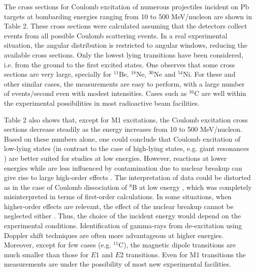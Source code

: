 \documentclass[prc,preprint,showpacs,showkeys,nofootinbib]{revtex4}%
\begin{document}
\newpage

The cross sections for Coulomb excitation of numerous projectiles
incident on Pb targets at bombarding energies ranging from 10 to 500
MeV/nucleon are shown in Table 2.  These cross sections were
calculated assuming that the detectors collect events from all
possible Coulomb scattering events. In a real experimental
situation, the angular distribution is restricted to angular
windows, reducing the available cross sections. Only the lowest
lying transitions have been considered, i.e. from the ground to the
first excited states. One observes that some cross sections are very
large, specially for $^{11}$Be, $^{18}$Ne, $^{30}$Ne and $^{54}$Ni.
For these and other similar cases, the measurements are easy to
perform, with a large number of events/second even with modest
intensities. Cases such as $^{16}$C are well within the experimental
possibilities in most radioactive beam facilities.

Table 2 also shows that, except for M1 excitations, the Coulomb
excitation cross sections decrease steadily as the energy increases
from 10 to 500 MeV/nucleon. Based on these numbers alone, one could
conclude that Coulomb excitation of low-lying states (in contrast to
the case of high-lying states, e.g. giant resonances \cite{BB85})
are better suited for studies at low energies. However, reactions at
lower energies while are less influenced by contamination due to
nuclear breakup \cite{BCH95,Cha07} can give rise to large high-order
effects \cite{BC92}. The interpretation of data could be distorted
as in the case of Coulomb dissociation of $^8$B at low energy
\cite{Kolata}, which was completely misinterpreted in terms of
first-order calculations. In some situations, when higher-order
effects are relevant, the effect of the nuclear breakup cannot be
neglected either \cite{Gai,Vitturi}. Thus, the choice of the
incident energy would depend on the experimental conditions.
Identification of gamma-rays from de-excitation using Doppler shift
techniques are often more advantageous at higher energies. Moreover,
except for few cases (e.g. $^{11}$C), the magnetic dipole
transitions are much smaller than those for $E1$ and $E2$
transitions. Even for M1 transitions the measurements are under the
possibility of most new experimental facilities.

\bigskip
\end{document}
